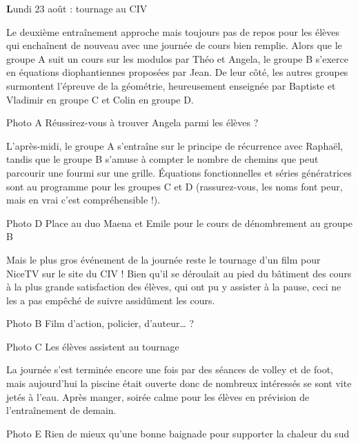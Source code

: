 \begin{center}
{\textbf Lundi 23 août : tournage au CIV}
\end{center}
\vspace{2mm}

Le deuxième entraînement approche mais toujours pas de repos pour les élèves qui enchaînent de nouveau avec une journée de cours bien remplie. Alors que le groupe A suit un cours sur les modulos par Théo et Angela, le groupe B s’exerce en équations diophantiennes proposées par Jean. De leur côté, les autres groupes surmontent l’épreuve de la géométrie, heureusement enseignée par Baptiste et Vladimir en groupe C et Colin en groupe D.

Photo A
Réussirez-vous à trouver Angela parmi les élèves ?

L’après-midi, le groupe A s’entraîne sur le principe de récurrence avec Raphaël, tandis que le groupe B s’amuse à compter le nombre de chemins que peut parcourir une fourmi sur une grille. Équations fonctionnelles et séries génératrices sont au programme pour les groupes C et D (rassurez-vous, les noms font peur, mais en vrai c’est compréhensible !).

Photo D
Place au duo Maena et Emile pour le cours de dénombrement au groupe B


Mais le plus gros événement de la journée reste le tournage d’un film pour NiceTV sur le site du CIV ! Bien qu’il se déroulait au pied du bâtiment des cours à la plus grande satisfaction des élèves, qui ont pu y assister à la pause, ceci ne les a pas empêché de suivre assidûment les cours.

Photo B
Film d’action, policier, d’auteur… ?

Photo C
Les élèves assistent au tournage

La journée s’est terminée encore une fois par des séances de volley et de foot, mais aujourd’hui la piscine était ouverte donc de nombreux intéressés se sont vite jetés à l’eau. Après manger, soirée calme pour les élèves en prévision de l’entraînement de demain.

Photo E
Rien de mieux qu’une bonne baignade pour supporter la chaleur du sud